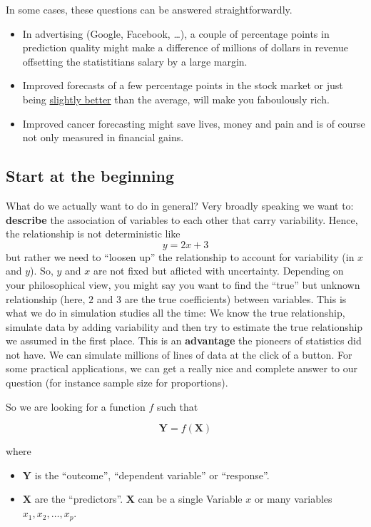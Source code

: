 \documentclass[
]{book}
\providecommand{\tightlist}{%
  \setlength{\itemsep}{0pt}\setlength{\parskip}{0pt}}
\begin{document}
In some cases, these questions can be answered straightforwardly.

\begin{itemize}
\item
  In advertising (Google, Facebook, \ldots), a couple of percentage points in prediction quality might make a difference of millions
  of dollars in revenue offsetting the statistitians salary by a large margin.
\item
  Improved forecasts of a few percentage points in the stock market or just being \href{https://en.wikipedia.org/wiki/Jim_Simons}{slightly better}
  than the average, will make you faboulously rich.
\item
  Improved cancer forecasting might save lives, money and pain and is of course
  not only measured in financial gains.
\end{itemize}

\subsection{Start at the beginning}\label{start-at-the-beginning}

What do we actually want to do in general? Very broadly speaking we want to:
\textbf{describe} the association of variables to each other that carry variability.
Hence, the relationship is not deterministic like \[y = 2x + 3\] but rather we need
to ``loosen up'' the relationship to account for variability (in \(x\) and \(y\)).
So, \(y\) and \(x\) are not fixed but aflicted with uncertainty.
Depending on your philosophical view, you might say you want to find
the ``true'' but unknown relationship (here, \(2\) and \(3\) are the true coefficients) between variables.
This is what we do in simulation studies all the time: We know the true relationship,
simulate data by adding variability and then try to estimate the true relationship we assumed in the first place.
This is an \textbf{advantage} the pioneers of statistics did not have. We can simulate
millions of lines of data at the click of a button.
For some practical applications, we can get a really nice and complete answer to our question
(for instance sample size for proportions).

So we are looking for a function \(f\) such that

\[ \mathbf{Y} = f(\mathbf{X}) \]

where

\begin{itemize}
\tightlist
\item
  \(\mathbf{Y}\) is the ``outcome'', ``dependent variable'' or ``response''.
\item
  \(\mathbf{X}\) are the ``predictors''. \(\mathbf{X}\) can be a single Variable \(x\) or many
  variables \(x_1, x_2, \ldots, x_p\).
\end{itemize}
\end{document}
